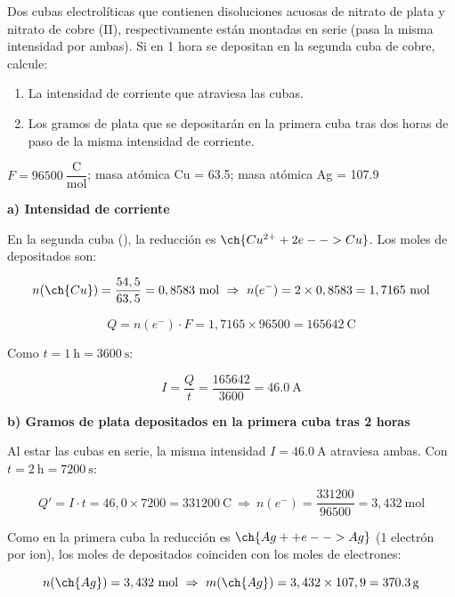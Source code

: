 \begin{exercise}
    Dos cubas electrolíticas que contienen disoluciones acuosas de nitrato de plata y nitrato de cobre (II), respectivamente están montadas en serie (pasa la misma intensidad por ambas). Si en 1 hora se depositan en la segunda cuba  de cobre, calcule:
    \begin{enumerate}[label=\letraminuscula]
        \item La intensidad de corriente que atraviesa las cubas.
        \item Los gramos de plata que se depositarán en la primera cuba tras dos horas de paso de la misma intensidad de corriente.
    \end{enumerate}
    \datos{} \(F = \num{96500}\ \dfrac{\text{C}}{\text{mol}}\); masa atómica Cu = \num{63.5}; masa atómica Ag = \num{107.9}
    \begin{solu}

        \textbf{a) Intensidad de corriente}

        En la segunda cuba (), la reducción es \(\ch{Cu^{2+} + 2 e- -> Cu}\). Los moles de  depositados son:

        \begin{equation*}
            n(\ch{Cu}) = \dfrac{54,5}{63,5} = 0,8583 \ \text{mol} \ \Rightarrow \ n(e^-) = 2 \times 0,8583 = 1,7165 \ \text{mol}
        \end{equation*}

        \begin{equation*}
            Q = n(e^-) \cdot F = 1,7165 \times 96500 = \SI{165642}{\coulomb}
        \end{equation*}

        Como \(t = \SI{1}{\hour} = \SI{3600}{\s}\):

        \begin{equation*}
            I = \dfrac{Q}{t} = \dfrac{165642}{3600} = \SI{46.0}{\ampere}
        \end{equation*}

        \textbf{b) Gramos de plata depositados en la primera cuba tras 2 horas}

        Al estar las cubas en serie, la misma intensidad \(I = \SI{46.0}{\ampere}\) atraviesa ambas. Con \(t = \SI{2}{\hour} = \SI{7200}{\s}\):

        \begin{equation*}
            Q' = I \cdot t = 46,0 \times 7200 = \SI{331200}{\coulomb} \ \Rightarrow \ n(e^-) = \dfrac{331200}{96500} = 3,432 \ \text{mol}
        \end{equation*}

        Como en la primera cuba la reducción es \(\ch{Ag+ + e- -> Ag}\) (1 electrón por ion), los moles de  depositados coinciden con los moles de electrones:

        \begin{equation*}
            n(\ch{Ag}) = 3,432 \ \text{mol} \ \Rightarrow \ m(\ch{Ag}) = 3,432 \times 107,9 = \SI{370.3}{\gram}
        \end{equation*}

    \end{solu}
\end{exercise}
